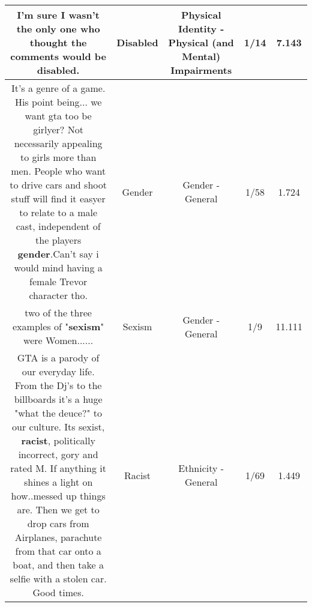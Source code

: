 \documentclass[11pt]{article}
\newlength\mylength
\begin{document}
\begin{center}
\begin{longtable}{|C{.65\mylength}|C{.30\mylength}|C{.12\mylength}|C{.12\mylength}|C{.12\mylength}|}
  \small I'm sure I wasn't the only one who thought the comments would be \textbf{disabled}.\normalsize   & Disabled & Physical Identity - Physical (and Mental) Impairments & 1/14 & 7.143 \\  \hline
  \small It's a genre of a game. His point being... we want gta too be girlyer? Not necessarily appealing to girls more than men.  People who want to drive cars and shoot stuff will find it easyer to relate to a male cast, independent of the players \textbf{gender}.Can't say i would mind having a female Trevor character tho.\normalsize   & Gender & Gender - General & 1/58 & 1.724 \\  \hline
  \small two of the three examples of "\textbf{sexism}" were Women......\normalsize   & Sexism & Gender - General & 1/9 & 11.111 \\  \hline
  \small GTA is a parody of our everyday life. From the Dj's to the billboards it's a huge "what the deuce?" to our culture. Its sexist, \textbf{racist}, politically incorrect, gory and rated M. If anything it shines a light on how..messed up things are. Then we get to drop cars from Airplanes, parachute from that car onto a boat, and then take a selfie with a stolen car. Good times.\normalsize   & Racist & Ethnicity - General & 1/69 & 1.449 \\  \hline

\end{longtable}
\end{center}
\end{document}
